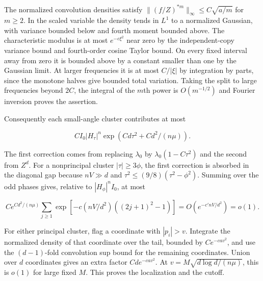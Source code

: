 The normalized convolution densities satisfy $\|(f/Z)^{*m}\|_\infty\le C\sqrt{a/m}$ for $m\ge2$. In the scaled variable the density tends in $L^1$ to a normalized Gaussian, with variance bounded below and fourth moment bounded above. The characteristic modulus is at most $e^{-c\xi^2}$ near zero by the independent-copy variance bound and fourth-order cosine Taylor bound. On every fixed interval away from zero it is bounded above by a constant smaller than one by the Gaussian limit. At larger frequencies it is at most $C/|\xi|$ by integration by parts, since the monotone halves give bounded total variation. Taking the split to large frequencies beyond $2C$, the integral of the $m$th power is $O(m^{-1/2})$ and Fourier inversion proves the assertion.

Consequently each small-angle cluster contributes at most

\begin{equation*}
C I_0 |H_\tau|^n \exp(Cd\tau^2+Cd^2/(n\mu)).
\end{equation*}

The first correction comes from replacing $\lambda_0$ by $\lambda_0(1-C\tau^2)$ and the second from $Z^d$. For a nonprincipal cluster $|\tau|\ge3\phi$, the first correction is absorbed in the diagonal gap because $nV\gg d$ and $\tau^2\le(9/8)(\tau^2-\phi^2)$. Summing over the odd phases gives, relative to $|H_\phi|^n I_0$, at most

\begin{equation*}
C e^{Cd^2/(n\mu)}
\sum_{j\ge1}\exp[-c(nV/d^2)((2j+1)^2-1)]
=O(e^{-c'nV/d^2})=o(1).
\end{equation*}

For either principal cluster, flag a coordinate with $|p_i|>v$. Integrate the normalized density of that coordinate over the tail, bounded by $C e^{-cav^2}$, and use the $(d-1)$-fold convolution sup bound for the remaining coordinates. Union over $d$ coordinates gives an extra factor $Cd e^{-cav^2}$. At $v=M\sqrt{d\log d/(n\mu)}$, this is $o(1)$ for large fixed $M$. This proves the localization and the cutoff.
